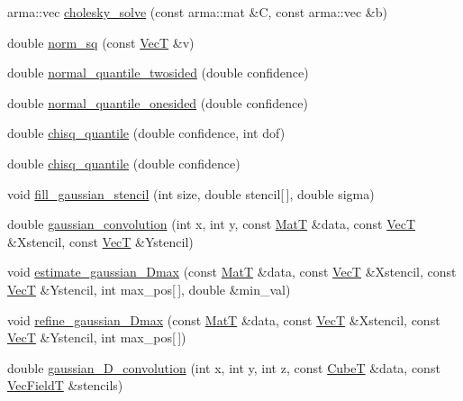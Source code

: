 \begin{DoxyCompactItemize}
arma\+::vec \hyperlink{namespacemappel_a83b18a0a288ca81106d44e26d830d6d5}{cholesky\+\_\+solve} (const arma\+::mat \&C, const arma\+::vec \&b)
\item 
double \hyperlink{namespacemappel_ab7fcefff8e308b8770181d592c390e09}{norm\+\_\+sq} (const \hyperlink{namespacemappel_a2225ad69f358daa3f4f99282a35b9a3a}{VecT} \&v)
\item 
double \hyperlink{namespacemappel_a69b8109164dc63d76f99ad0d9c149148}{normal\+\_\+quantile\+\_\+twosided} (double confidence)
\item 
double \hyperlink{namespacemappel_a7cf2f920819c8899c4f01d25072412db}{normal\+\_\+quantile\+\_\+onesided} (double confidence)
\item 
double \hyperlink{namespacemappel_adb714ee724b676c059233ddf224eb786}{chisq\+\_\+quantile} (double confidence, int dof)
\item 
double \hyperlink{namespacemappel_ad7b85a513735680d7c4eb551fe28857a}{chisq\+\_\+quantile} (double confidence)
\item 
void \hyperlink{namespacemappel_a09a770c2a4eaa7c083abbac26ec70ff3}{fill\+\_\+gaussian\+\_\+stencil} (int size, double stencil\mbox{[}$\,$\mbox{]}, double sigma)
\item 
double \hyperlink{namespacemappel_a93917141391e8f1ac5b4b5b0712cd29c}{gaussian\+\_\+convolution} (int x, int y, const \hyperlink{namespacemappel_a7091ab87c528041f7e2027195fad8915}{MatT} \&data, const \hyperlink{namespacemappel_a2225ad69f358daa3f4f99282a35b9a3a}{VecT} \&Xstencil, const \hyperlink{namespacemappel_a2225ad69f358daa3f4f99282a35b9a3a}{VecT} \&Ystencil)
\item 
void \hyperlink{namespacemappel_a3b80821e227772c7480e6d5d27090593}{estimate\+\_\+gaussian\+\_\+Dmax} (const \hyperlink{namespacemappel_a7091ab87c528041f7e2027195fad8915}{MatT} \&data, const \hyperlink{namespacemappel_a2225ad69f358daa3f4f99282a35b9a3a}{VecT} \&Xstencil, const \hyperlink{namespacemappel_a2225ad69f358daa3f4f99282a35b9a3a}{VecT} \&Ystencil, int max\+\_\+pos\mbox{[}$\,$\mbox{]}, double \&min\+\_\+val)
\item 
void \hyperlink{namespacemappel_ae0365a07ea08b7deae147915077091c8}{refine\+\_\+gaussian\+\_\+Dmax} (const \hyperlink{namespacemappel_a7091ab87c528041f7e2027195fad8915}{MatT} \&data, const \hyperlink{namespacemappel_a2225ad69f358daa3f4f99282a35b9a3a}{VecT} \&Xstencil, const \hyperlink{namespacemappel_a2225ad69f358daa3f4f99282a35b9a3a}{VecT} \&Ystencil, int max\+\_\+pos\mbox{[}$\,$\mbox{]})
\item 
double \hyperlink{namespacemappel_af7eb6e00596bd775bfefa5b8d826241d}{gaussian\+\_\+D\+\_\+convolution} (int x, int y, int z, const \hyperlink{namespacemappel_ab2afab4e6c8805e83946670d882768c2}{CubeT} \&data, const \hyperlink{namespacemappel_a834ec4f32487f07c0ca1e22d4928d1f8}{Vec\+FieldT} \&stencils)

\end{DoxyCompactItemize}

